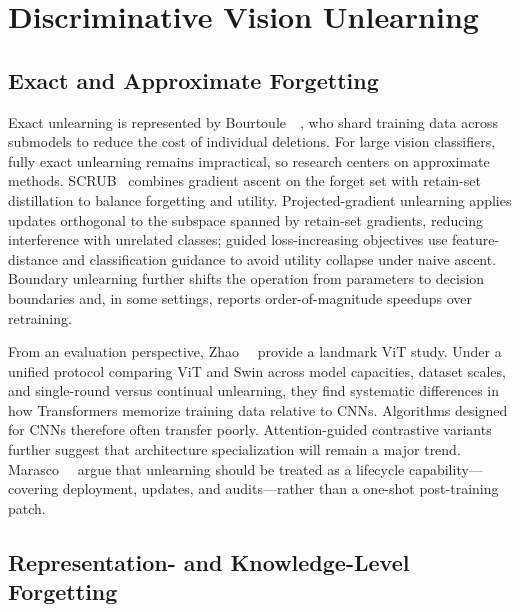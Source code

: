 \documentclass[10pt,twocolumn,letterpaper]{article}
\begin{document}
\section{Discriminative Vision Unlearning}

\subsection{Exact and Approximate Forgetting}

Exact unlearning is represented by Bourtoule~\etal~\cite{bourtoule2021}, who shard training data across submodels to reduce the cost of individual deletions. For large vision classifiers, fully exact unlearning remains impractical, so research centers on approximate methods. SCRUB~\cite{kurmanji2023scrub} combines gradient ascent on the forget set with retain-set distillation to balance forgetting and utility. Projected-gradient unlearning applies updates orthogonal to the subspace spanned by retain-set gradients, reducing interference with unrelated classes; guided loss-increasing objectives use feature-distance and classification guidance to avoid utility collapse under naive ascent. Boundary unlearning further shifts the operation from parameters to decision boundaries and, in some settings, reports order-of-magnitude speedups over retraining.

From an evaluation perspective, Zhao~\etal~\cite{zhao2026vit} provide a landmark ViT study. Under a unified protocol comparing ViT and Swin across model capacities, dataset scales, and single-round versus continual unlearning, they find systematic differences in how Transformers memorize training data relative to CNNs. Algorithms designed for CNNs therefore often transfer poorly. Attention-guided contrastive variants further suggest that architecture specialization will remain a major trend. Marasco~\etal~\cite{marasco2026} argue that unlearning should be treated as a lifecycle capability---covering deployment, updates, and audits---rather than a one-shot post-training patch.

\subsection{Representation- and Knowledge-Level Forgetting}
\end{document}
